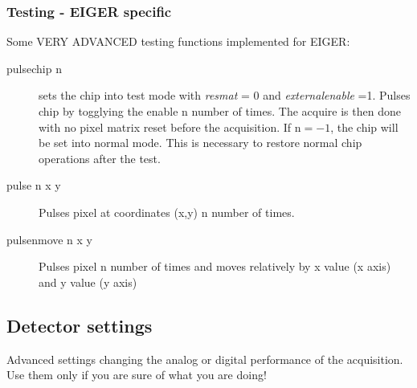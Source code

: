 \documentclass{article}
\newcommand{\E}{EIGER\xspace}
\begin{document}
\subsubsection{Testing - \E specific}
Some VERY ADVANCED testing functions implemented for \E:
\begin{description}
\item [pulsechip n] sets the chip into test mode with \textit{resmat} = 0 and \textit{externalenable} =1.  Pulses chip by togglying the enable n number of times. The acquire is then done with no pixel matrix reset before the acquisition. If n$=-1$, the chip will be set into normal mode. This is necessary to restore normal chip operations after the test.
\item[pulse n x y] Pulses pixel at coordinates (x,y) n number of times. 
\item[pulsenmove n x y] Pulses pixel n number of times and moves relatively by x value (x axis) and y value (y axis)
\end{description}

\subsection{Detector settings}
Advanced settings changing the analog or digital performance of the acquisition. Use them only if you are sure of what you are doing!
\end{document}
